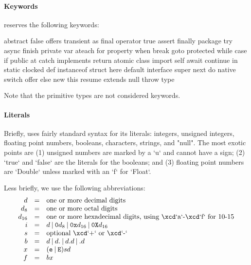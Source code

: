 \paragraph{Keywords}
\Xten{} reserves the following keywords:
\begin{xten}
abstract       false          offers         transient      
as             final          operator       true           
assert         finally        package        try            
async          finish         private        var            
ateach         for            property       when           
break          goto           protected      while          
case           if             public         at             
catch          implements     return         atomic         
class          import         self           await          
continue       in             static         clocked        
def            instanceof     struct         here           
default        interface      super          next           
do             native         switch         offer          
else           new            this           resume         
extends        null           throw          type           
\end{xten}
Note that the primitive types are not considered keywords.

\paragraph{Literals}\label{Literals}

Briefly, \XtenCurrVer{} uses fairly standard syntax for its literals:
integers, unsigned integers, floating point numbers, booleans, 
characters, strings, and \xcd"null".  The most exotic points are (1) unsigned
numbers are marked by a \xcd`u` and cannot have a sign; (2) \xcd`true` and
\xcd`false` are the literals for the booleans; and (3) floating point numbers
are \xcd`Double` unless marked with an \xcd`f` for \xcd`Float`. 

Less briefly, we use the following abbreviations: 
\begin{displaymath}
\begin{array}{rcll}
d &=& \mbox{one or more decimal digits}\\
d_8 &=& \mbox{one or more octal digits}\\
d_{16} &=& \mbox{one or more hexadecimal digits, using \xcd`a`-\xcd`f`
for 10-15}\\
i &=& d 
        \mathbin{|} {\tt 0} d_8 
        \mathbin{|} {\tt 0x} d_{16}
        \mathbin{|} {\tt 0X} d_{16}
\\
s &=& \mbox{optional \xcd`+` or \xcd`-`}\\
b &=& d 
          \mathbin{|} d {\tt .}
          \mathbin{|} d {\tt .} d
          \mathbin{|}  {\tt .} d \\
x &=& ({\tt e } \mathbin{|} {\tt E})
         s
         d \\
f &=& b x
\end{array}
\end{displaymath}

